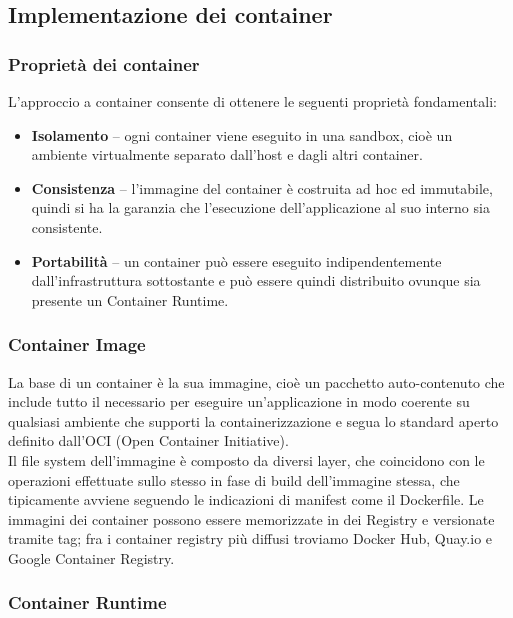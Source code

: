 \subsection{Implementazione dei container}

\subsubsection{Proprietà dei container}

L'approccio a container consente di ottenere le seguenti proprietà fondamentali:
\begin{itemize}
    \item \textbf{Isolamento} -- ogni container viene eseguito in una sandbox, cioè un ambiente virtualmente separato dall'host e dagli altri container. 
    \item \textbf{Consistenza} -- l'immagine del container è costruita ad hoc ed immutabile, quindi si ha la garanzia che l'esecuzione dell'applicazione al suo interno sia consistente.
    \item \textbf{Portabilità} -- un container può essere eseguito indipendentemente dall'infrastruttura sottostante e può essere quindi distribuito ovunque sia presente un Container Runtime.
\end{itemize}

\subsubsection{Container Image}
\label{subsec:oci}
La base di un container è la sua immagine, cioè un pacchetto auto-contenuto che include tutto il necessario per eseguire un'applicazione in modo coerente su qualsiasi ambiente che supporti la containerizzazione e segua lo standard aperto definito dall’OCI (Open Container Initiative).\\
Il file system dell'immagine è composto da diversi layer, che coincidono con le operazioni effettuate sullo stesso in fase di build dell'immagine stessa, che tipicamente avviene seguendo le indicazioni di manifest come il Dockerfile. Le immagini dei container possono essere memorizzate in dei Registry e versionate tramite tag; fra i container registry più diffusi troviamo Docker Hub, Quay.io e Google Container Registry.

\subsubsection{Container Runtime}

